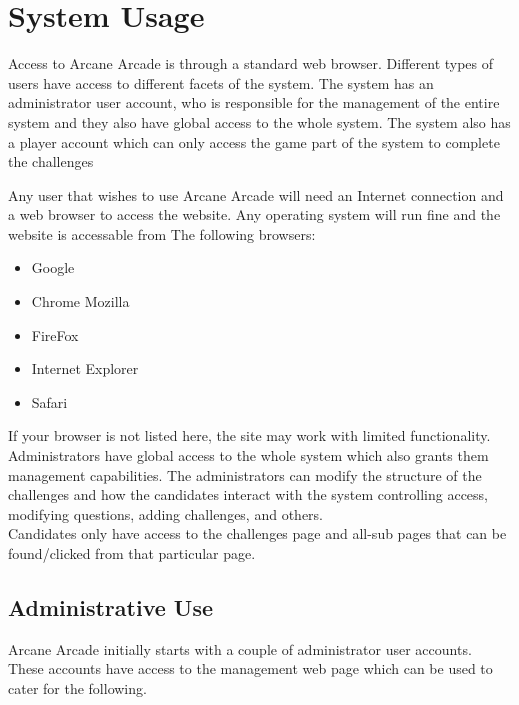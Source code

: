 \documentclass[english]{article}
\begin{document}
 
	
	\section{System Usage}
	
	Access to Arcane Arcade is through a standard web browser. Different types of users have access to different facets of the system. The system has an administrator user account, who is responsible for the management of the entire system and they also have global access to the whole system. The system also has a player account which can only access the game part of the system to complete the challenges
	\newline

	Any user that wishes to use Arcane Arcade will need an Internet connection and a web browser to access the website. Any operating system will run ﬁne and the website is accessable from The following browsers: 
	\begin{itemize}
		\item Google
		\item Chrome Mozilla 
		\item FireFox 
		\item Internet Explorer 
		\item Safari 
	\end{itemize}
	If your browser is not listed here, the site may work with limited functionality.\\
	
Administrators have global access to the whole system which also grants them management capabilities. The administrators can modify the structure of the challenges and how the candidates interact with the system controlling access, modifying questions, adding challenges, and others.
		\\[12pt]
	Candidates only have access to the challenges page and all-sub pages that can be found/clicked from that particular page.
	
	
		\subsection{Administrative Use}
		Arcane Arcade initially starts with a couple of administrator user accounts. These accounts have access to the management web page which can be used to cater for the following.\newline
\end{document}
